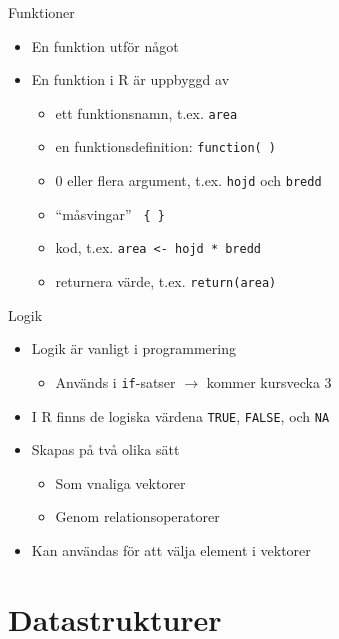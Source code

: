\documentclass[
  11pt,
  ignorenonframetext,
]{beamer}
\providecommand{\tightlist}{%
  \setlength{\itemsep}{0pt}\setlength{\parskip}{0pt}}
\begin{document}
\begin{frame}{Funktioner}
\label{funktioner}
\begin{itemize}
\tightlist
\item
  En funktion utför något
\item
  En funktion i R är uppbyggd av

  \begin{itemize}
  \tightlist
  \item
    ett funktionsnamn, t.ex. \texttt{area}
  \item
    en funktionsdefinition: \texttt{function( )}
  \item
    0 eller flera argument, t.ex. \texttt{hojd} och \texttt{bredd}
  \item
    ``måsvingar'' \texttt{ \{ \} }
  \item
    kod, t.ex. \texttt{area <- hojd * bredd}
  \item
    returnera värde, t.ex. \texttt{return(area)}
  \end{itemize}
\end{itemize}
\end{frame}

\begin{frame}{Logik}
\label{logik}
\begin{itemize}
\tightlist
\item
  Logik är vanligt i programmering

  \begin{itemize}
  \tightlist
  \item
    Används i \texttt{if}-satser $\rightarrow$ kommer kursvecka 3
  \end{itemize}
\item
  I R finns de logiska värdena \texttt{TRUE}, \texttt{FALSE}, och
  \texttt{NA}
\item
  Skapas på två olika sätt

  \begin{itemize}
  \tightlist
  \item
    Som vnaliga vektorer
  \item
    Genom relationsoperatorer
  \end{itemize}
\item
  Kan användas för att välja element i vektorer
\end{itemize}
\end{frame}

\section{Datastrukturer}\label{datastrukturer}
\end{document}
